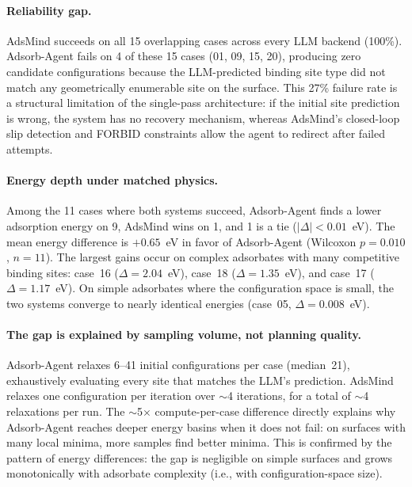 \paragraph{Reliability gap.}
AdsMind succeeds on all 15 overlapping cases across every LLM backend (100\%).
Adsorb-Agent fails on 4 of these 15 cases (01, 09, 15, 20), producing zero candidate configurations because the LLM-predicted binding site type did not match any geometrically enumerable site on the surface.
This 27\% failure rate is a structural limitation of the single-pass architecture: if the initial site prediction is wrong, the system has no recovery mechanism, whereas AdsMind's closed-loop slip detection and FORBID constraints allow the agent to redirect after failed attempts.

\paragraph{Energy depth under matched physics.}
Among the 11 cases where both systems succeed, Adsorb-Agent finds a lower adsorption energy on 9, AdsMind wins on 1, and 1 is a tie ($|\Delta| < 0.01$~eV).
The mean energy difference is $+0.65$~eV in favor of Adsorb-Agent (Wilcoxon $p = 0.010$, $n = 11$).
The largest gains occur on complex adsorbates with many competitive binding sites: case~16 ($\Delta = 2.04$~eV), case~18 ($\Delta = 1.35$~eV), and case~17 ($\Delta = 1.17$~eV).
On simple adsorbates where the configuration space is small, the two systems converge to nearly identical energies (case~05, $\Delta = 0.008$~eV).

\paragraph{The gap is explained by sampling volume, not planning quality.}
Adsorb-Agent relaxes 6--41 initial configurations per case (median~21), exhaustively evaluating every site that matches the LLM's prediction.
AdsMind relaxes one configuration per iteration over $\sim$4 iterations, for a total of $\sim$4 relaxations per run.
The $\sim$5$\times$ compute-per-case difference directly explains why Adsorb-Agent reaches deeper energy basins when it does not fail: on surfaces with many local minima, more samples find better minima.
This is confirmed by the pattern of energy differences: the gap is negligible on simple surfaces and grows monotonically with adsorbate complexity (i.e., with configuration-space size).

